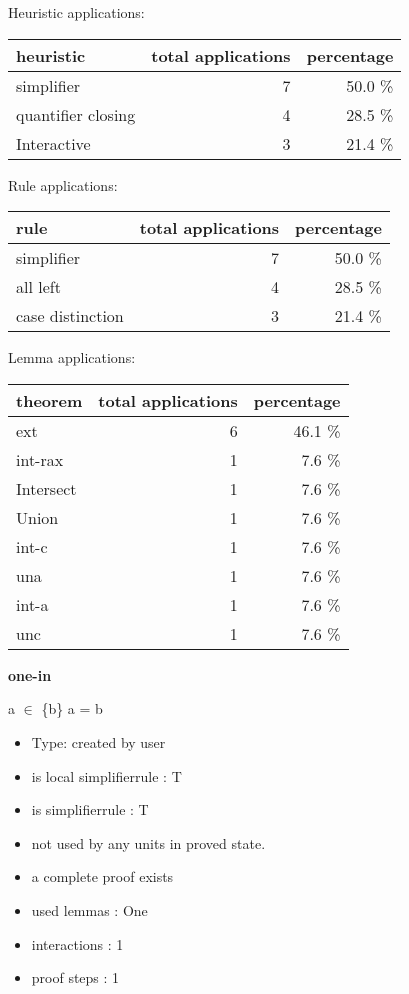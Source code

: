 \documentclass[a4paper]{article}
\begin{document}
\medskip


Heuristic applications:

\begin{supertabular}{l|r|r}
heuristic	& total applications & percentage \\ \hline
simplifier & 7 & 50.0 \% \\
quantifier closing & 4 & 28.5 \% \\
Interactive & 3 & 21.4 \% \\

\end{supertabular}

Rule applications:

\begin{supertabular}{l|r|r}
rule	        & total applications & percentage \\ \hline
simplifier & 7 & 50.0 \% \\
all left & 4 & 28.5 \% \\
case distinction & 3 & 21.4 \% \\

\end{supertabular}

Lemma applications:

\begin{supertabular}{l|r|r}
theorem	        & total applications & percentage \\ \hline
ext & 6 & 46.1 \% \\
int-rax & 1 & 7.6 \% \\
Intersect & 1 & 7.6 \% \\
Union & 1 & 7.6 \% \\
int-c & 1 & 7.6 \% \\
una & 1 & 7.6 \% \\
int-a & 1 & 7.6 \% \\
unc & 1 & 7.6 \% \\

\end{supertabular}
\pagebreak

{\LARGE\bf one-in}\label{lemma-one-in}

\medskip

 \Fol a $\in$ \{b\} \Equiv a = b

\begin{itemize}

\item Type: created by user

\item is local simplifierrule : T
\item is simplifierrule : T
\item not used by any units in proved state.
\item       a complete proof exists
\item       used lemmas  : One
\item       interactions : 1
\item       proof steps  : 1
\end{itemize}
\end{document}
